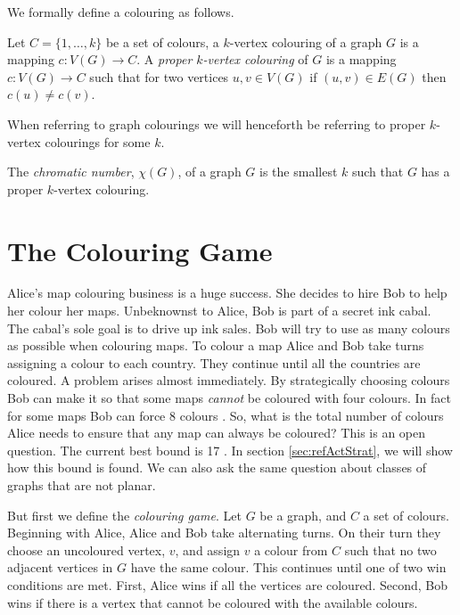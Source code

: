 We formally define a colouring as follows.
\begin{definition}
Let $C=\{1,\dots,k\}$ be a set of colours, a $k$-vertex colouring of a graph $G$ is a mapping $c\colon V(G) \to C$. A \textit{proper $k$-vertex colouring} of $G$ is a mapping $c\colon V(G) \to C$ such that for two vertices $u,v\in V(G)$ if $(u,v)\in E(G)$ then $c(u)\neq c(v)$. 
\end{definition}
When referring to graph colourings we will henceforth be referring to proper $k$-vertex colourings for some $k$. 
\begin{definition} 
The \textit{chromatic number}, $\chi(G)$, of a graph $G$ is the smallest $k$ such that $G$ has a proper $k$-vertex colouring.
\end{definition} 

\section{The Colouring Game} \label{sec:colouring_game}
Alice's map colouring business is a huge success. She decides to hire Bob to help her colour her maps. Unbeknownst to Alice, Bob is part of a secret ink cabal. The cabal's sole goal is to drive up ink sales. Bob will try to use as many colours as possible when colouring maps. To colour a map Alice and Bob take turns assigning a colour to each country. They continue until all the countries are coloured. A problem arises almost immediately. By strategically choosing colours Bob can make it so that some maps \textit{cannot} be coloured with four colours. In fact for some maps Bob can force 8 colours \cite{kierstead1994planar}. So, what is the total number of colours Alice needs to ensure that any map can always be coloured? This is an open question. The current best bound is 17 \cite{Zhu2008}. In section \ref{sec:refActStrat}, we will show how this bound is found. We can also ask the same question about classes of graphs that are not planar. 

But first we define the \textit{colouring game}. Let $G$ be a graph, and $C$ a set of colours. Beginning with Alice, Alice and Bob take alternating turns. On their turn they choose an uncoloured vertex, $v$, and assign $v$ a colour from $C$ such that no two adjacent vertices in $G$ have the same colour. This continues until one of two win conditions are met. First, Alice wins if all the vertices are coloured. Second, Bob wins if there is a vertex that cannot be coloured with the available colours.

